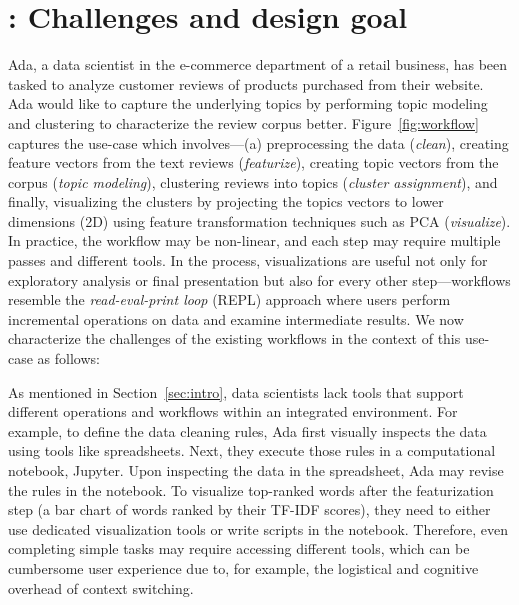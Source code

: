 \section{\vita: Challenges and design goal}
\label{sec:example}

Ada, a data scientist in the e-commerce department of a retail business, has been tasked to analyze customer reviews of products purchased from their website. Ada would like to capture the underlying topics by performing topic modeling and clustering to characterize the review corpus better. Figure~\ref{fig:workflow} captures the use-case which involves---(a) preprocessing the data (\emph{clean}), creating feature vectors from the text reviews (\emph{featurize}), creating topic vectors from the corpus (\emph{topic modeling}), clustering reviews into topics (\emph{cluster assignment}), and finally, visualizing the clusters by projecting the topics vectors to lower dimensions (2D) using feature transformation techniques such as PCA (\emph{visualize}). In practice, the workflow may be non-linear, and each step may require multiple passes and different tools. In the process, visualizations are useful not only for exploratory analysis or final presentation but also for every other step---\vita workflows resemble the \emph{read-eval-print loop} (REPL) approach where users perform incremental operations on data and examine intermediate results. We now characterize the challenges of the existing \vita  workflows in the context of this use-case as follows:





As mentioned in Section~\ref{sec:intro}, data scientists lack tools 
that support different \vita operations and workflows within an integrated environment.
For example, to define the data cleaning rules, Ada first visually inspects the data using tools like spreadsheets. Next, they execute those rules in a computational notebook, \eg Jupyter. Upon inspecting the data in the spreadsheet, Ada may revise the rules in the notebook. To visualize top-ranked words after the featurization step (\eg a bar chart of words ranked by their TF-IDF scores), they need to either use dedicated visualization tools or write scripts in the notebook. Therefore, even completing simple tasks may require accessing different tools, which can be cumbersome user experience due to, for example, the logistical and cognitive overhead of context switching.
 
